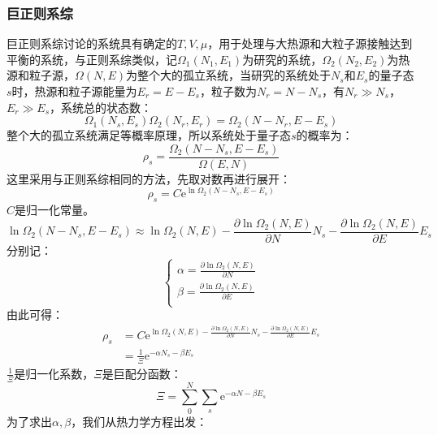 \documentclass[12pt]{article}
\begin{document}
\subsubsection{巨正则系综}
\noindent
巨正则系综讨论的系统具有确定的$T, V, \mu$，用于处理与大热源和大粒子源接触达到平衡的系统，与正则系综类似，记$\Omega_1(N_1, E_1)$为研究的系统，$\Omega_2(N_2, E_2)$为热源和粒子源，$\Omega(N, E)$为整个大的孤立系统，当研究的系统处于$N_s$和$E_s$的量子态$s$时，热源和粒子源能量为$E_r=E-E_s$，粒子数为$N_r=N-N_s$，有$N_r\gg N_s$，$E_r\gg E_s$，系统总的状态数：
\begin{equation}
	\Omega_1(N_s, E_s)\Omega_2(N_r, E_r)=\Omega_2(N-N_r, E-E_s)
\end{equation}
整个大的孤立系统满足等概率原理，所以系统处于量子态$s$的概率为：
\begin{equation}
	\rho_s=\frac{\Omega_2(N-N_s, E-E_s)}{\Omega(E,N)}
\end{equation}
这里采用与正则系综相同的方法，先取对数再进行展开：
\begin{equation}
	\rho_s=C\mathrm{e}^{\ln \Omega_2(N-N_s, E-E_s)}
\end{equation}
$C$是归一化常量。
\begin{equation}
	\ln \Omega_2(N-N_s, E-E_s)\approx \ln \Omega_2(N, E)-\frac{\partial \ln \Omega_2(N,E)}{\partial N}N_s-\frac{\partial \ln \Omega_2(N, E)}{\partial E}E_s
\end{equation}
分别记：
\begin{equation}
	\left\{\begin{split}
		\alpha=\frac{\partial \ln \Omega_2(N,E)}{\partial N}\\
		\beta=\frac{\partial \ln \Omega_2(N, E)}{\partial E}\\
	\end{split}\right.
\end{equation}
由此可得：
\begin{equation}
	\begin{split}
	\rho_s&=C\mathrm{e}^{\ln \Omega_2(N, E)-\frac{\partial \ln \Omega_2(N,E)}{\partial N}N_s-\frac{\partial \ln \Omega_2(N, E)}{\partial E}E_s}
	\\&=\frac{1}{\Xi}\mathrm{e}^{-\alpha N_s-\beta E_s}
\end{split}
\end{equation}
$\frac{1}{\Xi}$是归一化系数，$\Xi$是巨配分函数：
\begin{equation}
	\Xi=\sum_{0}^{N}\sum_s \mathrm{e}^{-\alpha N-\beta E_s}
\end{equation}
为了求出$\alpha, \beta$，我们从热力学方程出发：
\end{document}

